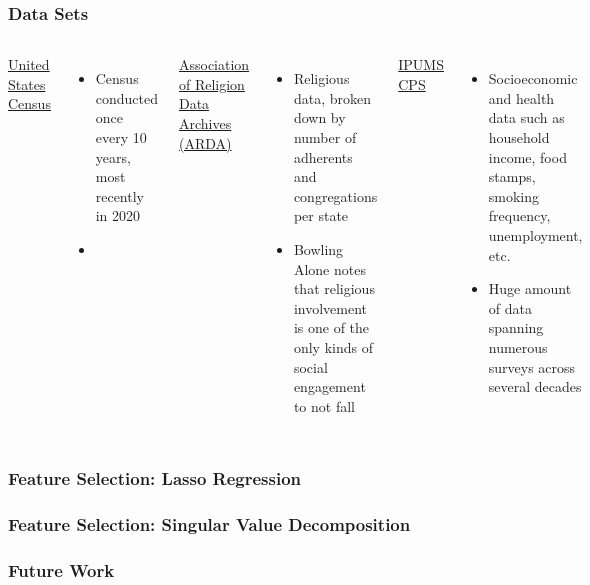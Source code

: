 \documentclass{beamer}
\theoremstyle{definition}
\theoremstyle{remark}
\begin{document}
\begin{frame}
    \frametitle{Data Sets}

    \begin{columns}[T]
        \uline{United States Census}

        \begin{itemize}
            \item Census conducted once every 10 years, most recently in 2020
            \item
        \end{itemize}

        \uline{Association of Religion Data Archives (ARDA)}

        \begin{itemize}
            \item Religious data, broken down by number of adherents and congregations per state
            \item Bowling Alone notes that religious involvement is one of the only kinds of social engagement to not fall
        \end{itemize}

        \uline{IPUMS CPS}

        \begin{itemize}
            \item Socioeconomic and health data such as household income, food stamps, smoking frequency, unemployment, etc.
            \item Huge amount of data spanning numerous surveys across several decades
        \end{itemize}

    \end{columns}


\end{frame}

\begin{frame}

    \frametitle{Feature Selection: Lasso Regression}

\end{frame}

\begin{frame}

    \frametitle{Feature Selection: Singular Value Decomposition}

\end{frame}

\begin{frame}

    \frametitle{}

\end{frame}

\begin{frame}

    \frametitle{Future Work}

\end{frame}
\end{document}
